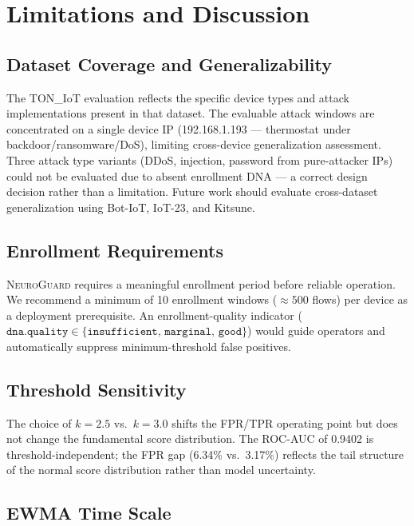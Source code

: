 \documentclass[journal,10pt,twoside]{IEEEtran}
\newcommand{\neuroguard}{\textsc{NeuroGuard}}
\begin{document}
\section{Limitations and Discussion}
\label{sec:limitations}

\subsection{Dataset Coverage and Generalizability}

The TON\_IoT evaluation reflects the specific device types and attack
implementations present in that dataset.
The evaluable attack windows are concentrated on a single device
IP (192.168.1.193 --- thermostat under backdoor/ransomware/DoS), limiting
cross-device generalization assessment.
Three attack type variants (DDoS, injection, password from pure-attacker IPs)
could not be evaluated due to absent enrollment DNA --- a correct design
decision rather than a limitation.
Future work should evaluate cross-dataset generalization using Bot-IoT, IoT-23,
and Kitsune.

\subsection{Enrollment Requirements}

\neuroguard{} requires a meaningful enrollment period before reliable
operation.
We recommend a minimum of 10 enrollment windows ($\approx500$ flows) per
device as a deployment prerequisite.
An enrollment-quality indicator
($\texttt{dna.quality} \in \{\texttt{insufficient},\, \texttt{marginal},\,
\texttt{good}\}$) would guide operators and automatically suppress
minimum-threshold false positives.

\subsection{Threshold Sensitivity}

The choice of $k=2.5$ vs.\ $k=3.0$ shifts the FPR/TPR operating point but
does not change the fundamental score distribution.
The ROC-AUC of 0.9402 is threshold-independent; the FPR gap (6.34\% vs.\
3.17\%) reflects the tail structure of the normal score distribution rather
than model uncertainty.

\subsection{EWMA Time Scale}
\end{document}

